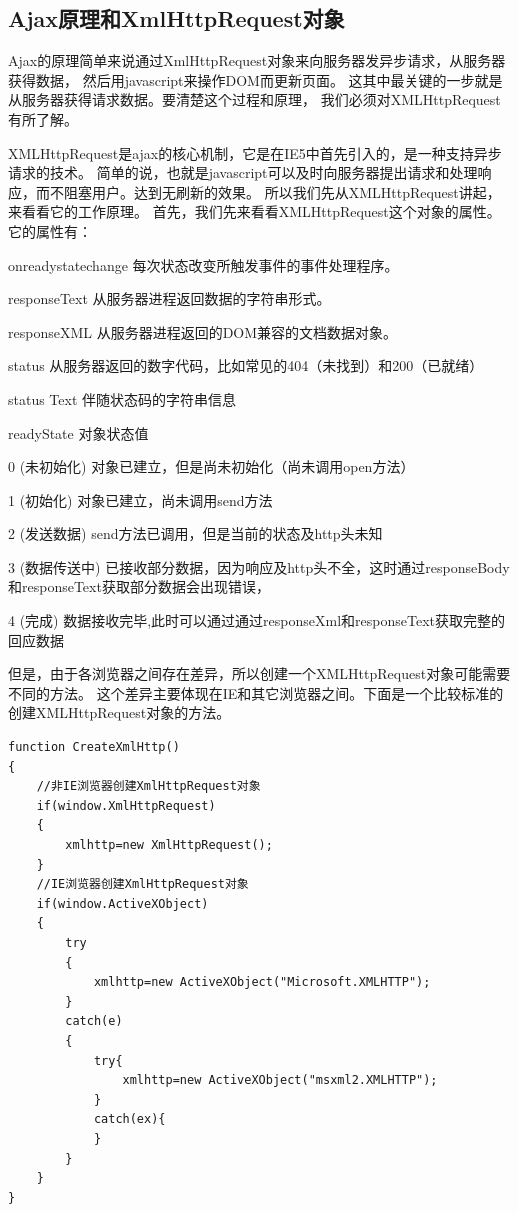 \documentclass{book}
\begin{document}
\subsection{Ajax原理和XmlHttpRequest对象}

Ajax的原理简单来说通过XmlHttpRequest对象来向服务器发异步请求，从服务器获得数据，
然后用javascript来操作DOM而更新页面。
这其中最关键的一步就是从服务器获得请求数据。要清楚这个过程和原理，
我们必须对XMLHttpRequest有所了解。

XMLHttpRequest是ajax的核心机制，它是在IE5中首先引入的，是一种支持异步请求的技术。
简单的说，也就是javascript可以及时向服务器提出请求和处理响应，而不阻塞用户。达到无刷新的效果。
所以我们先从XMLHttpRequest讲起，来看看它的工作原理。
首先，我们先来看看XMLHttpRequest这个对象的属性。
它的属性有：

onreadystatechange  每次状态改变所触发事件的事件处理程序。

responseText     从服务器进程返回数据的字符串形式。

responseXML    从服务器进程返回的DOM兼容的文档数据对象。

status           从服务器返回的数字代码，比如常见的404（未找到）和200（已就绪）

status Text       伴随状态码的字符串信息

readyState       对象状态值

0 (未初始化) 对象已建立，但是尚未初始化（尚未调用open方法）

1 (初始化) 对象已建立，尚未调用send方法

2 (发送数据) send方法已调用，但是当前的状态及http头未知

3 (数据传送中) 已接收部分数据，因为响应及http头不全，这时通过responseBody和responseText获取部分数据会出现错误，

4 (完成) 数据接收完毕,此时可以通过通过responseXml和responseText获取完整的回应数据

但是，由于各浏览器之间存在差异，所以创建一个XMLHttpRequest对象可能需要不同的方法。
这个差异主要体现在IE和其它浏览器之间。下面是一个比较标准的创建XMLHttpRequest对象的方法。

\begin{lstlisting}[language=VBScript]
function CreateXmlHttp()
{
	//非IE浏览器创建XmlHttpRequest对象
	if(window.XmlHttpRequest)
	{
		xmlhttp=new XmlHttpRequest();
	}
	//IE浏览器创建XmlHttpRequest对象
	if(window.ActiveXObject)
	{
		try
		{
			xmlhttp=new ActiveXObject("Microsoft.XMLHTTP");  
		}
		catch(e)
		{
			try{
			 	xmlhttp=new ActiveXObject("msxml2.XMLHTTP");
			}
			catch(ex){
			}
		}
	}
}  
\end{lstlisting}
\end{document}
